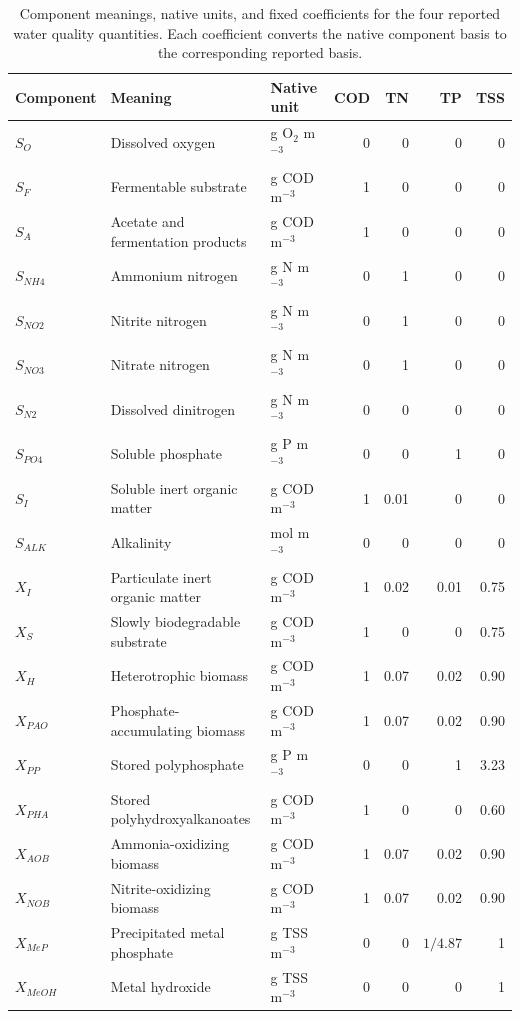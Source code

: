 \begin{table}[htbp]
\centering
\caption{Component meanings, native units, and fixed coefficients for the four reported water quality quantities. Each coefficient converts the native component basis to the corresponding reported basis.}
\label{tab:component_basis_composites}
\scriptsize
\setlength{\tabcolsep}{3pt}
\begin{tabular}{lp{4.15cm}lrrrr}
\toprule
Component & Meaning & Native unit & COD & TN & TP & TSS\\
\midrule
$S_O$ & Dissolved oxygen & g O$_2$ m$^{-3}$ & 0 & 0 & 0 & 0\\
$S_F$ & Fermentable substrate & g COD m$^{-3}$ & 1 & 0 & 0 & 0\\
$S_A$ & Acetate and fermentation products & g COD m$^{-3}$ & 1 & 0 & 0 & 0\\
$S_{NH4}$ & Ammonium nitrogen & g N m$^{-3}$ & 0 & 1 & 0 & 0\\
$S_{NO2}$ & Nitrite nitrogen & g N m$^{-3}$ & 0 & 1 & 0 & 0\\
$S_{NO3}$ & Nitrate nitrogen & g N m$^{-3}$ & 0 & 1 & 0 & 0\\
$S_{N2}$ & Dissolved dinitrogen & g N m$^{-3}$ & 0 & 0 & 0 & 0\\
$S_{PO4}$ & Soluble phosphate & g P m$^{-3}$ & 0 & 0 & 1 & 0\\
$S_I$ & Soluble inert organic matter & g COD m$^{-3}$ & 1 & 0.01 & 0 & 0\\
$S_{ALK}$ & Alkalinity & mol m$^{-3}$ & 0 & 0 & 0 & 0\\
$X_I$ & Particulate inert organic matter & g COD m$^{-3}$ & 1 & 0.02 & 0.01 & 0.75\\
$X_S$ & Slowly biodegradable substrate & g COD m$^{-3}$ & 1 & 0 & 0 & 0.75\\
$X_H$ & Heterotrophic biomass & g COD m$^{-3}$ & 1 & 0.07 & 0.02 & 0.90\\
$X_{PAO}$ & Phosphate-accumulating biomass & g COD m$^{-3}$ & 1 & 0.07 & 0.02 & 0.90\\
$X_{PP}$ & Stored polyphosphate & g P m$^{-3}$ & 0 & 0 & 1 & 3.23\\
$X_{PHA}$ & Stored polyhydroxyalkanoates & g COD m$^{-3}$ & 1 & 0 & 0 & 0.60\\
$X_{AOB}$ & Ammonia-oxidizing biomass & g COD m$^{-3}$ & 1 & 0.07 & 0.02 & 0.90\\
$X_{NOB}$ & Nitrite-oxidizing biomass & g COD m$^{-3}$ & 1 & 0.07 & 0.02 & 0.90\\
$X_{MeP}$ & Precipitated metal phosphate & g TSS m$^{-3}$ & 0 & 0 & $1/4.87$ & 1\\
$X_{MeOH}$ & Metal hydroxide & g TSS m$^{-3}$ & 0 & 0 & 0 & 1\\
\bottomrule
\end{tabular}
\end{table}

